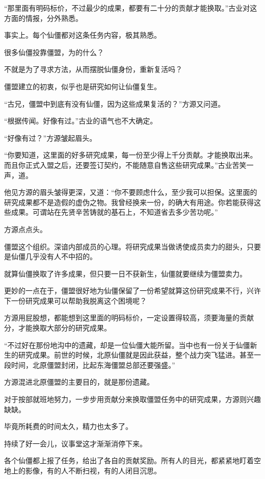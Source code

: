 \begin{this_body}
“那里面有明码标价，不过最少的成果，都要有二十分的贡献才能换取。”古业对这方面的情报，分外熟悉。

事实上。每个仙僵都对这条任务内容，极其熟悉。

很多仙僵投靠僵盟，为的什么？

不就是为了寻求方法，从而摆脱仙僵身份，重新复活吗？

僵盟建立的初衷，似乎也是研究如何让仙僵复生。

“古兄，僵盟中到底有没有仙僵，因为这些成果复活的？”方源又问道。

“根据传闻。好像有过。”古业的语气也不大确定。

“好像有过？”方源皱起眉头。

“你要知道，这里面的好多研究成果，每一份至少得上千分贡献。才能换取出来。而且你正式入盟之后，还要签订契约，不能随意自售这些研究成果。”古业苦笑一声，道。

他见方源的眉头皱得更深，又道：“你不要顾虑什么，至少我可以担保。这里面的研究成果都不是造假的虚伪之物。我曾经换来一份，的确大有用途。你若能获得这些成果。可谓站在先贤辛苦铸就的基石上，不知道省去多少苦功呢。”

方源点点头。

僵盟这个组织。深谙内部成员的心理。将研究成果当做诱使成员卖力的甜头，只要是仙僵几乎没有人不中招的。

就算仙僵换取了许多成果，但只要一日不获新生，仙僵就要继续为僵盟卖力。

更妙的一点在于，僵盟很好地为仙僵保留了一份希望就算这份研究成果不行，兴许下一份研究成果可以帮助我脱离这个困境呢？

方源用屁股想，都能想到这里面的明码标价，一定设置得较高，须要海量的贡献分，才能换取大部分的研究成果。

“不过好在那份地沟中的遗藏，却是一位仙僵大能所留。当中也有一份关于仙僵新生的研究成果。前世的时候，北原仙僵就是因此获益，整个战力突飞猛进。甚至一段时间，北原僵盟封闭，比起东海僵盟总部还要强盛。”

方源混进北原僵盟的主要目的，就是那份遗藏。

对于按部就班地努力，一步步用贡献分来换取僵盟任务中的研究成果，方源则兴趣缺缺。

毕竟所耗费的时间太久，精力也太多了。

持续了好一会儿，议事堂这才渐渐消停下来。

各个仙僵都上报了任务，给出了各自的贡献奖励。所有人的目光，都紧紧地盯着空地上的影像，有的人不断扫视，有的人闭目沉思。


\end{this_body}
